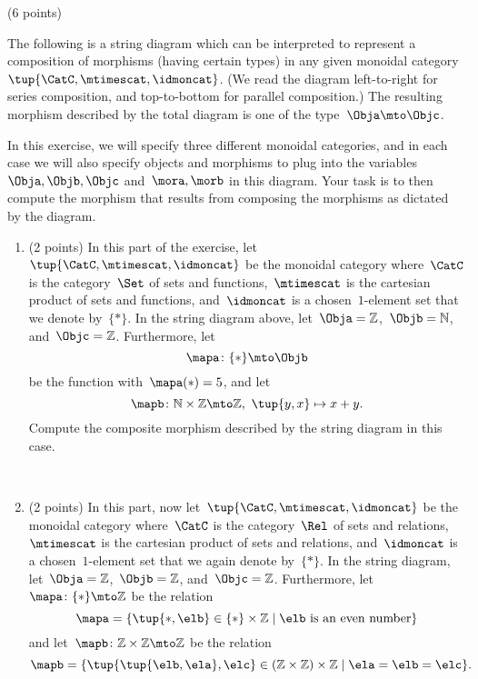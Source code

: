 \documentclass[paper=8.125in:10.250in,pagesize=pdftex,
    headinclude=false,footinclude=false,oneside,egregdoesnotlikesansseriftitles]{kaobook}
\begin{document}
\begin{gradedexercise}\label{ex:StringDiagrams} (6 points) 

The following is a string diagram which can be interpreted to represent a composition of morphisms (having certain types) in any given monoidal category~$\tup{\CatC,\mtimescat,\idmoncat}$. (We read the diagram left-to-right for series composition, and top-to-bottom for parallel composition.) The resulting morphism described by the total diagram is one of the type~$\Obja \mto \Objc$.

\begin{center}
    \label{eq:ExamStringDiagram1}
\end{center}

In this exercise, we will specify three different monoidal categories, and in each case we will also specify objects and morphisms to plug into the variables~$\Obja, \Objb, \Objc$ and~$\mora, \morb$ in this diagram.
Your task is to then compute the morphism that results from composing the morphisms as dictated by the diagram.

\begin{enumerate}
\item (2 points) In this part of the exercise, let~$\tup{\CatC,\mtimescat,\idmoncat}$ be the monoidal category where~$\CatC$ is the category~$\Set$ of sets and functions,~$\mtimescat$ is the cartesian product of sets and functions, and~$\idmoncat$ is a chosen~$1$-element set that we denote by~$\{ * \}$.
In the string diagram above, let~$\Obja = \mathbb{Z}$,~$\Objb = \mathbb{N}$, and~$\Objc = \mathbb{Z}$.
Furthermore, let~
$$\mapa\colon \{ * \} \mto \Objb$$ 
be the function with~$\mapa(*) = 5$, and let~
$$\mapb \colon \mathbb{N} \times \mathbb{Z} \mto \mathbb{Z}, \ \tup{y, x} \mapsto x + y.$$
Compute the composite morphism described by the string diagram in this case.

\

\item (2 points) In this part, now let~$\tup{\CatC,\mtimescat,\idmoncat}$ be the monoidal category where~$\CatC$ is the category~$\Rel$ of sets and relations,~$\mtimescat$ is the cartesian product of sets and relations, and~$\idmoncat$ is a chosen~$1$-element set that we again denote by~$\{ * \}$.
In the string diagram, let~$\Obja = \mathbb{Z}$,~$\Objb = \mathbb{Z}$, and~$\Objc = \mathbb{Z}$.
Furthermore, let~$\mapa\colon \{ * \} \mto \mathbb{Z}$ be the relation
\begin{equation*}
\mapa = \{ \tup{*, \elb} \in \{ *\} \times \mathbb{Z} \mid \elb \text{ is an even number} \}
\end{equation*}
and let~$\mapb \colon \mathbb{Z} \times \mathbb{Z} \mto \mathbb{Z}$ be the relation
\begin{equation*}
\mapb = \{ \tup{\tup{\elb, \ela}, \elc} \in (\mathbb{Z} \times \mathbb{Z}) \times \mathbb{Z} \mid \ela = \elb = \elc \}.
\end{equation*}


\end{enumerate}
\end{gradedexercise}
\end{document}
